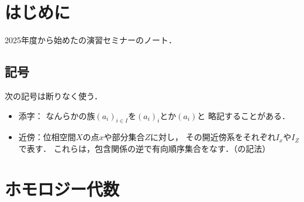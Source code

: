 
\def\inner<#1>{\langle #1 \rangle}









\maketitle
\layout
\chapter*{はじめに}
2025年度から始めた\cite{KS90}の演習セミナーのノート．

\section*{記号}
次の記号は断りなく使う．
\begin{itemize}
    \item 添字：
    なんらかの族$(a_i)_{i\in I}$を$(a_i)_i$とか$(a_i)$と
    略記することがある．
    \item 近傍：位相空間\(X\)の点\(x\)や部分集合\(Z\)に対し，
    その開近傍系をそれぞれ\(I_x\)や\(I_Z\)で表す．
    これらは，包含関係の逆で有向順序集合をなす．（\cite[Def1.1.7]{KS24b}の記法）
\end{itemize}
\tableofcontents
\chapter{ホモロジー代数}
